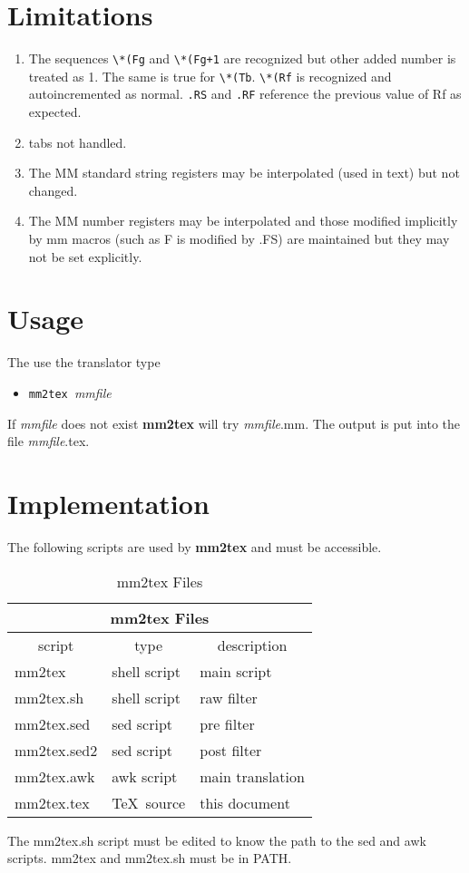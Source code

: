 \section{Limitations}
  \begin{enumerate}
    \item The sequences \verb|\*(Fg| and \verb|\*(Fg+1| are recognized
          but other added number is treated as 1.  The same is true
          for \verb|\*(Tb|.  \verb|\*(Rf| is recognized and
          autoincremented as normal.  \verb|.RS| and \verb|.RF|
          reference the previous value of Rf as expected.
    \item tabs not handled.
    \item The MM standard string registers may be interpolated (used
          in text) but not changed. 
    \item The MM number registers may be interpolated and those
          modified implicitly by mm macros (such as F is modified by
          .FS) are maintained but they may not be set explicitly.
  \end{enumerate}
\section{Usage}
The use the translator type
\begin{itemize}
\item[]
\verb|mm2tex |{\it mmfile}
\end{itemize}
If {\it mmfile\/} does not exist {\bf mm2tex} will try {\it mmfile}.mm.
The output is put into the file {\it mmfile}.tex.  
\section{Implementation}
The following
scripts are used by {\bf mm2tex} and must be accessible.
\begin{table}[htp]
\noindent
\begin{center}
\begin{tabular}{|l|l|l|}
\hline
\multicolumn{3}{|c|}{{\vrule height12pt width0pt depth3.5pt\Large
mm2tex Files}}\\ 
\hline\hline
\multicolumn{1}{|c|}{script}&\multicolumn{1}{c|}{type}&\multicolumn{1}{c|}{description}\\
\hline
mm2tex&      shell script&      main script\\
mm2tex.sh&   shell script&      raw filter\\
mm2tex.sed&  sed script&  pre filter\\
mm2tex.sed2&  sed script& post filter\\
mm2tex.awk&   awk script&     main translation\\
mm2tex.tex&   \TeX\ source&   this document\\
\hline
\end{tabular}
\end{center}
\medskip
\caption{\label{tab:scripts}mm2tex Files}
\end{table}
The mm2tex.sh script must be edited to know the path to the sed and
awk scripts.  mm2tex and mm2tex.sh must be in PATH.
